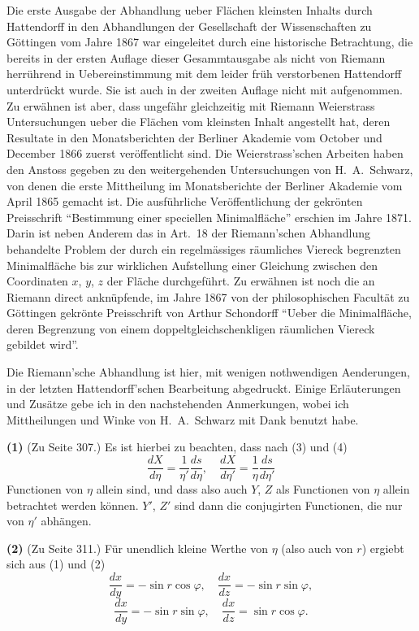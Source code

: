 \documentclass[12pt,a4paper]{article}
\begin{document}
Die erste Ausgabe der Abhandlung ueber Fl\"achen kleinsten Inhalts durch Hattendorff in den Abhandlungen der Gesellschaft der Wissenschaften zu G\"ottingen vom Jahre 1867 war eingeleitet durch eine historische Betrachtung, die bereits in der ersten Auflage dieser Gesammtausgabe als nicht von Riemann herr\"uhrend in Uebereinstimmung mit dem leider fr\"uh verstorbenen Hattendorff unterdr\"uckt wurde. Sie ist auch in der zweiten Auflage nicht mit aufgenommen. Zu erw\"ahnen ist aber, dass ungef\"ahr gleichzeitig mit Riemann Weierstrass Untersuchungen ueber die Fl\"achen vom kleinsten Inhalt angestellt hat, deren Resultate in den Monatsberichten der Berliner Akademie vom October und December 1866 zuerst ver\"offentlicht sind. Die Weierstrass'schen Arbeiten haben den Anstoss gegeben zu den weitergehenden Untersuchungen von H.~A.~Schwarz, von denen die erste Mittheilung im Monatsberichte der Berliner Akademie vom April 1865 gemacht ist. Die ausf\"uhrliche Ver\"offentlichung der gekr\"onten Preisschrift ``Bestimmung einer speciellen Minimalfl\"ache'' erschien im Jahre 1871. Darin ist neben Anderem das in Art.~18 der Riemann'schen Abhandlung behandelte Problem der durch ein regelm\"assiges r\"aumliches Viereck begrenzten Minimalfl\"ache bis zur wirklichen Aufstellung einer Gleichung zwischen den Coordinaten $x$, $y$, $z$ der Fl\"ache durchgef\"uhrt. Zu erw\"ahnen ist noch die an Riemann direct ankn\"upfende, im Jahre 1867 von der philosophischen Facult\"at zu G\"ottingen gekr\"onte Preisschrift von Arthur Schondorff ``Ueber die Minimalfl\"ache, deren Begrenzung von einem doppeltgleichschenkligen r\"aumlichen Viereck gebildet wird''.

Die Riemann'sche Abhandlung ist hier, mit wenigen nothwendigen Aenderungen, in der letzten Hattendorff'schen Bearbeitung abgedruckt. Einige Erl\"auterungen und Zus\"atze gebe ich in den nachstehenden Anmerkungen, wobei ich Mittheilungen und Winke von H.~A.~Schwarz mit Dank benutzt habe.

\medskip
\noindent\textbf{(1)} (Zu Seite 307.) Es ist hierbei zu beachten, dass nach (3) und (4)
\[\frac{dX}{d\eta} = \frac{1}{\eta'} \frac{ds}{d\eta}, \quad \frac{dX}{d\eta'} = \frac{1}{\eta} \frac{ds}{d\eta'}\]
Functionen von $\eta$ allein sind, und dass also auch $Y$, $Z$ als Functionen von $\eta$ allein betrachtet werden k\"onnen. $Y'$, $Z'$ sind dann die conjugirten Functionen, die nur von $\eta'$ abh\"angen.

\medskip
\noindent\textbf{(2)} (Zu Seite 311.) F\"ur unendlich kleine Werthe von $\eta$ (also auch von $r$) ergiebt sich aus (1) und (2)
\[\frac{dx}{dy} = -\sin r \cos\varphi, \quad \frac{dx}{dz} = -\sin r \sin\varphi,\]
\[\frac{dx}{dy} = -\sin r \sin\varphi, \quad \frac{dx}{dz} = \sin r \cos\varphi.\]
\end{document}
